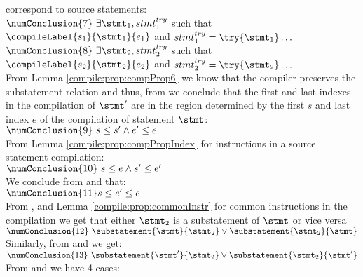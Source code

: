 correspond to source statements: 
 \\
$\numConclusion{7} \ \exists \stmt_1, stmt^{try}_1 $ such that $  \compileLabel{s_1}{\stmt_1}{e_1}$ and $  stmt^{try}_1 = \try\{ \stmt_1\} \ldots $ \\
$\numConclusion{8} \ \exists \stmt_2,stmt^{try}_2$ such that $ \compileLabel{s_2}{\stmt_2}{e_2} $ and $ stmt^{try}_2 = \try\{ \stmt_2\} \ldots $ \\
From Lemma \ref{compile:prop:compProp6} we know that the compiler preserves the  substatement relation and thus, from  we conclude that 
the first and last indexes in the compilation of $\stmt'$ are in the region determined by the first $s$ and last index $e$ of the compilation 
of statement $\stmt$: \\
$\numConclusion{9} \ s \le s' \wedge e' \le e  $ \\
From Lemma \ref{compile:prop:compPropIndex} for instructions in a source statement compilation:  \\
$\numConclusion{10} \ s \le  e  \wedge s' \le  e'  $ \\
We conclude from   and     that: \\
$  \numConclusion{11}   s  \le  e' \le  e  $\\
From  ,  and Lemma \ref{compile:prop:commonInstr} for common instructions in the compilation we
get that either $\stmt_2$ is a substatement of $\stmt$  or vice versa\\
$  \numConclusion{12} \    \substatement{\stmt}{\stmt_2} \vee \substatement{\stmt_2}{\stmt}  $\\
Similarly, from  and  we get: \\
$  \numConclusion{13} \    \substatement{\stmt'}{\stmt_2} \vee \substatement{\stmt_2}{\stmt'}  $\\
From  and  we have 4 cases: \\ 
